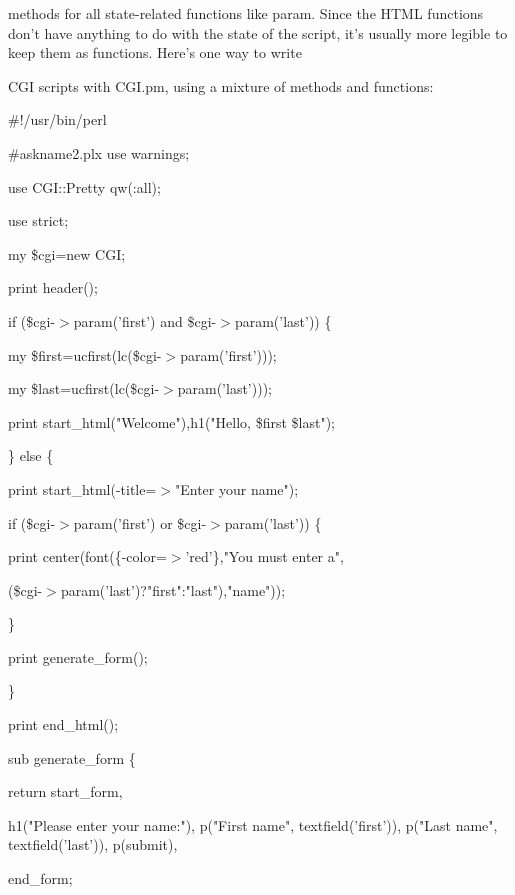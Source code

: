 \documentclass[a4paper,11pt]{book}
\begin{document}
\noindent methods for all state-related functions like param. Since the HTML functions don't have anything to do with the state of the script, it's usually more legible to keep them as functions. Here's one way to write

\noindent CGI scripts with CGI.pm, using a mixture of methods and functions:

\noindent 

\noindent \#!/usr/bin/perl

\noindent \#askname2.plx use warnings;

\noindent use CGI::Pretty qw(:all);

\noindent use strict;

\noindent 

\noindent my \$cgi=new CGI;

\noindent 

\noindent print header();

\noindent if (\$cgi-$>$param('first') and \$cgi-$>$param('last')) \{

\noindent my \$first=ucfirst(lc(\$cgi-$>$param('first')));

\noindent my \$last=ucfirst(lc(\$cgi-$>$param('last')));

\noindent print start\_html("Welcome"),h1("Hello, \$first \$last");

\noindent \} else \{

\noindent print start\_html(-title=$>$"Enter your name");

\noindent if (\$cgi-$>$param('first') or \$cgi-$>$param('last')) \{

\noindent print center(font(\{-color=$>$'red'\},"You must enter a",

\noindent (\$cgi-$>$param('last')?"first":"last"),"name"));

\noindent \}

\noindent 

\noindent 

\noindent print generate\_form();

\noindent \}

\noindent print end\_html();

\noindent 

\noindent sub generate\_form \{

\noindent return start\_form,

\noindent h1("Please enter your name:"), p("First name", textfield('first')), p("Last name", textfield('last')), p(submit),

\noindent end\_form;
\end{document}
